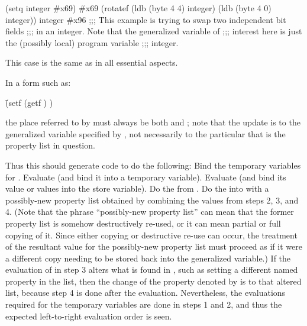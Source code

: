 \code
 (setq integer #x69) \EV #x69
 (rotatef (ldb (byte 4 4) integer) 
          (ldb (byte 4 0) integer))
 integer \EV #x96
;;; This example is trying to swap two independent bit fields 
;;; in an integer.  Note that the generalized variable of 
;;; interest here is just the (possibly local) program variable
;;; integer.
\endcode
 
 
   This case is the same as  in all essential aspects.
 
 
    In a form such as:
 
\f{(setf (getf  ) )}
 
    the place referred to by  must always be both 
    and ;  note that the update is to the generalized variable 
    specified by , not necessarily to the particular 
that is the property list in question.
 
    Thus this  should generate code to do the following:
\beginlist
{} 
Bind the temporary variables for .
Evaluate  (and bind it into a temporary variable).
Evaluate  (and bind 
its value or values into the store variable).
Do the  from .
Do the  into  with a possibly-new property list
       obtained by combining the values from steps 2, 3, and 4.  
(Note that the phrase ``possibly-new property list'' can mean that 
    the former property list is somehow destructively re-used, or it can 
    mean partial or full copying of it.  
Since either copying or destructive re-use can occur, 
the treatment of the resultant value for the 
    possibly-new property list must proceed as if it were a different copy
    needing to be stored back into the generalized variable.)
\endlist 
    If the evaluation of  
in step 3 alters what is found in
, such as setting a different named property in the list,
    then the change of the property denoted by  
is to that 
    altered list, because step 4 is done after the 
    evaluation.  Nevertheless, the 
    evaluations required for  
the temporary variables  are done in steps 1 and 
    2,  and thus the expected left-to-right evaluation order is seen.

